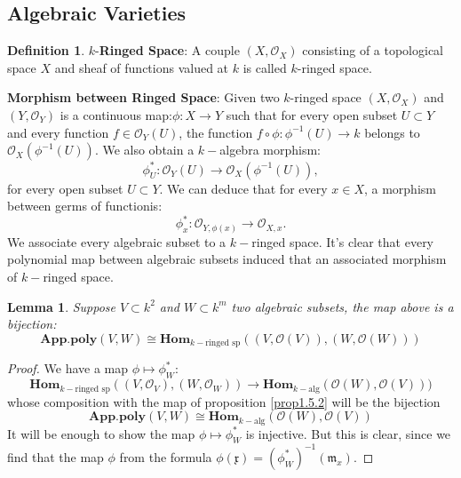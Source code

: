 \documentclass[12pt,a4paper,english]{article}
\theoremstyle{plain}
\newtheorem{lem}[thm]{Lemma}
\theoremstyle{definition}
\newtheorem{defi}{Definition}
\theoremstyle{remark}
\newcommand{\homo}{\mathbf{Hom}}
\begin{document}
\subsection{Algebraic Varieties}
\begin{defi}
$k$-\textbf{Ringed Space}: A couple $(X,\mathcal{O}_{X})$ consisting of a topological space $X$ and sheaf of functions valued at $k$ is called $k$-ringed space.

\textbf{Morphism between Ringed Space}: Given two $k$-ringed space $(X,\mathcal{O}_{X})$ and $(Y,\mathcal{O}_{Y})$ is a continuous map:$\phi:X\rightarrow Y$ such that for every open subset $U\subset Y$ and every function $f\in\mathcal{O}_{Y}(U)$, the function $f\circ\phi:\phi^{-1}(U)\rightarrow k$ belongs to $\mathcal{O}_{X}(\phi^{-1}(U))$. We also obtain a $k-$algebra morphism:
\begin{equation*}
    \phi^{*}_{U}:\mathcal{O}_{Y}(U)\rightarrow \mathcal{O}_{X}(\phi^{-1}(U)),
\end{equation*}
for every open subset $U\subset Y$. We can deduce that for every $x\in X$, a morphism between germs of functionis:
\begin{equation*}
    \phi^{*}_{x}:\mathcal{O}_{Y,\phi(x)}\rightarrow\mathcal{O}_{X,x}.
\end{equation*}
We associate every algebraic subset to a $k-$ringed space. It's clear that every polynomial map between algebraic subsets induced that an associated morphism of $k-$ringed space.
\end{defi}
\begin{lem}
Suppose $V\subset k^{2}$ and $W\subset k^{m}$ two algebraic subsets, the map above is a bijection:
\begin{equation*}
    \textbf{App.poly}(V,W)\cong \homo_{k-\text{ringed sp}}((V,\mathcal{O}(V)),(W,\mathcal{O}(W)))
\end{equation*}
\end{lem}
\begin{proof}
We have a map $\phi\mapsto \phi^{*}_{W}$:
\begin{equation*}
    \homo_{k-\text{ringed sp}}((V,\mathcal{O}_{V}),(W,\mathcal{O}_{W}))\rightarrow \homo_{k-\text{alg}}(\mathcal{O}(W),\mathcal{O}(V)))
\end{equation*}
whose composition with the map of proposition \ref{prop1.5.2} will be the bijection
\begin{equation*}
        \textbf{App.poly}(V,W)\cong \homo_{k-\text{alg}}(\mathcal{O}(W),\mathcal{O}(V))
\end{equation*}
It will be enough to show the map $\phi\mapsto\phi^{*}_{W}$ is injective. But this is clear, since we find that the map $\phi$ from the formula $\mathfrak{\phi(x)}=(\phi^{*}_{W})^{-1}(\mathfrak{m}_{x})$.
\end{proof}
\end{document}
